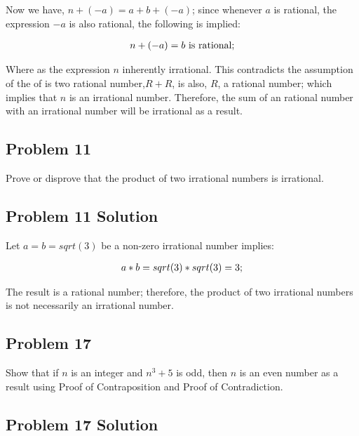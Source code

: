 \documentclass[11pt]{article}
\begin{document}
Now we have, $n + (-a) = a + b + (-a)$; since whenever $a$ is rational, the expression $-a$ is also rational, the following is implied:

\begin{displaymath}
\begin{tabular}{c}
$n + (-a) = b$ is rational; \\
\end{tabular}
\end{displaymath}

Where as the expression $n$ inherently irrational. This contradicts the assumption of the of is two rational number,$ R+ R$, is also, $R$, a rational number; which implies that $n$ is an irrational number. Therefore, the sum of an rational number with an irrational number will be irrational as a result.

\subsection{Problem 11}

Prove or disprove that the product of two irrational numbers is irrational.

\subsection{Problem 11 Solution}

Let $a = b = sqrt(3)$ be a non-zero irrational number implies:

\begin{displaymath}
\begin{tabular}{c}
$a * b = sqrt(3) * sqrt(3) = 3;$ \\
\end{tabular}
\end{displaymath}

The result is a rational number; therefore, the product of two irrational numbers is not necessarily an irrational number.

\subsection{Problem 17}

Show that if $n$ is an integer and $n^3 + 5$ is odd, then $n$ is an even number as a result using Proof of Contraposition and Proof of Contradiction.

\subsection{Problem 17 Solution}
\end{document}
